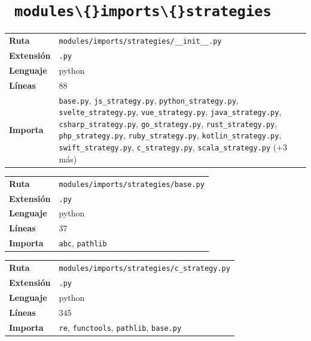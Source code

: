 \documentclass[12pt, a4paper]{report}
\begin{document}
\medskip

\section{\ \texttt{modules\textbackslash\{\}imports\textbackslash\{\}strategies}}

\begin{fichabox}
\small
\begin{tabular}{@{}ll@{}}
  \textbf{Ruta} & \texttt{modules/imports/strategies/\_\_init\_\_.py} \\
  \textbf{Extensión} & \texttt{.py} \\
  \textbf{Lenguaje} & python \\
  \textbf{Líneas} & 88 \\
  \textbf{Importa} & \parbox[t]{10cm}{\texttt{base.py}, \texttt{js\_strategy.py}, \texttt{python\_strategy.py}, \texttt{svelte\_strategy.py}, \texttt{vue\_strategy.py}, \texttt{java\_strategy.py}, \texttt{csharp\_strategy.py}, \texttt{go\_strategy.py}, \texttt{rust\_strategy.py}, \texttt{php\_strategy.py}, \texttt{ruby\_strategy.py}, \texttt{kotlin\_strategy.py}, \texttt{swift\_strategy.py}, \texttt{c\_strategy.py}, \texttt{scala\_strategy.py} \textcolor{muted}{(+3 más)}} \\
\end{tabular}
\end{fichabox}

\medskip

\begin{fichabox}
\small
\begin{tabular}{@{}ll@{}}
  \textbf{Ruta} & \texttt{modules/imports/strategies/base.py} \\
  \textbf{Extensión} & \texttt{.py} \\
  \textbf{Lenguaje} & python \\
  \textbf{Líneas} & 37 \\
  \textbf{Importa} & \parbox[t]{10cm}{\texttt{abc}, \texttt{pathlib}} \\
\end{tabular}
\end{fichabox}

\medskip

\begin{fichabox}
\small
\begin{tabular}{@{}ll@{}}
  \textbf{Ruta} & \texttt{modules/imports/strategies/c\_strategy.py} \\
  \textbf{Extensión} & \texttt{.py} \\
  \textbf{Lenguaje} & python \\
  \textbf{Líneas} & 345 \\
  \textbf{Importa} & \parbox[t]{10cm}{\texttt{re}, \texttt{functools}, \texttt{pathlib}, \texttt{base.py}} \\
\end{tabular}
\end{fichabox}
\end{document}
